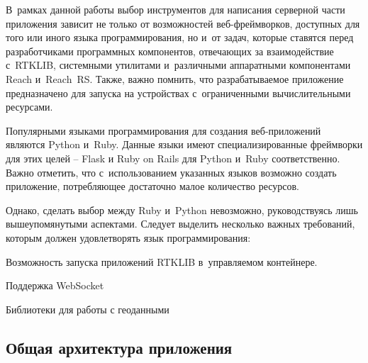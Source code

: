 В~рамках данной работы выбор инструментов для написания серверной части приложения зависит не только от возможностей веб-фреймворков, доступных для того или иного языка программирования, но и~от задач, которые ставятся перед разработчиками программных компонентов, отвечающих за взаимодействие с~RTKLIB, системными утилитами и~различными аппаратными компонентами Reach и~Reach~RS. Также, важно помнить, что разрабатываемое приложение предназначено для запуска на устройствах с~ограниченными вычислительными ресурсами. \par

Популярными языками программирования для создания веб-приложений являются Python и~Ruby. Данные языки имеют специализированные фреймворки для этих целей -- Flask и Ruby on Rails для Python и~Ruby соответственно. Важно отметить, что с~использованием указанных языков возможно создать приложение, потребляющее достаточно малое количество ресурсов. \par

Однако, сделать выбор между Ruby и~Python невозможно, руководствуясь лишь вышеупомянутыми аспектами. Следует выделить несколько важных требований, которым должен удовлетворять язык программирования:

\begin{dashitemize}
  \item Возможность запуска приложений RTKLIB в~управляемом контейнере.
  \item Поддержка WebSocket
  \item Библиотеки для работы с геоданными
\end{dashitemize}

\subsection{Общая архитектура приложения}

\newpage

